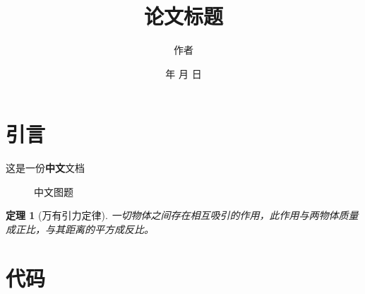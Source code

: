 \documentclass[11pt,a4paper]{article}
\newtheorem{theorem}{定理}[section]
\renewcommand{\today}{\number\year 年 \number\month 月 \number\day 日}
\begin{document}
\title{论文标题}
\author{作者}
\date{\today}
\maketitle

\tableofcontents


\newpage
\section{引言}

这是一份\textbf{中文}文档

\begin{figure}

\caption{中文图题}
\end{figure}


\begin{theorem}[万有引力定律]
一切物体之间存在相互吸引的作用，此作用与两物体质量成正比，与其距离的平方成反比。
\end{theorem}


\newpage
\appendix
\appendixpage
\addappheadtotoc
\section{代码}\label{app:title}
\end{document}
